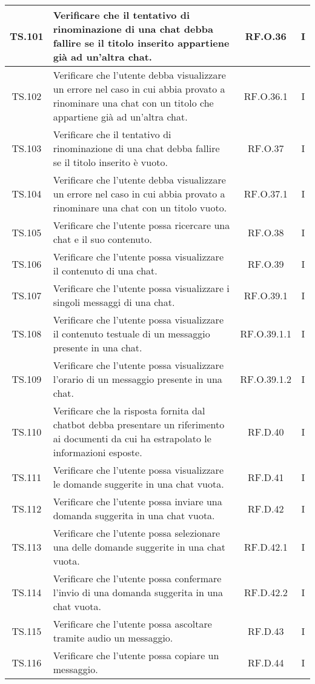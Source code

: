 {{{{{{{{{{\begin{xltabular}{\textwidth}{|c|X|c|c|}
\hline
TS.101 & Verificare che il tentativo di rinominazione di una chat debba fallire se il titolo inserito appartiene già ad un’altra chat. & RF.O.36 & I \\
\hline
TS.102 & Verificare che l'utente debba visualizzare un errore nel caso in cui abbia provato a rinominare una chat con un titolo che appartiene già ad un’altra chat. & RF.O.36.1 & I \\
\hline
TS.103 & Verificare che il tentativo di rinominazione di una chat debba fallire se il titolo inserito è vuoto. & RF.O.37 & I \\
\hline
TS.104 & Verificare che l'utente debba visualizzare un errore nel caso in cui abbia provato a rinominare una chat con un titolo vuoto. & RF.O.37.1 & I \\
\hline
TS.105 & Verificare che l'utente possa ricercare una chat e il suo contenuto. & RF.O.38 & I \\
\hline
TS.106 & Verificare che l'utente possa visualizzare il contenuto di una chat. & RF.O.39 & I \\
\hline
TS.107 & Verificare che l'utente possa visualizzare i singoli messaggi di una chat. & RF.O.39.1 & I \\
\hline
TS.108 & Verificare che l'utente possa visualizzare il contenuto testuale di un messaggio presente in una chat. & RF.O.39.1.1 & I \\
\hline
TS.109 & Verificare che l'utente possa visualizzare l’orario di un messaggio presente in una chat. & RF.O.39.1.2 & I \\
\hline
TS.110 & Verificare che la risposta fornita dal chatbot debba presentare un riferimento ai documenti da cui ha estrapolato le informazioni esposte. & RF.D.40 & I \\
\hline
TS.111 & Verificare che l'utente possa visualizzare le domande suggerite in una chat vuota. & RF.D.41 & I \\
\hline
TS.112 & Verificare che l'utente possa inviare una domanda suggerita in una chat vuota. & RF.D.42 & I \\
\hline
TS.113 & Verificare che l'utente possa selezionare una delle domande suggerite in una chat vuota. & RF.D.42.1 & I \\
\hline
TS.114 & Verificare che l'utente possa confermare l’invio di una domanda suggerita in una chat vuota. & RF.D.42.2 & I \\
\hline
TS.115 & Verificare che l'utente possa ascoltare tramite audio un messaggio. & RF.D.43 & I \\
\hline
TS.116 & Verificare che l'utente possa copiare un messaggio. & RF.D.44 & I \\

\end{xltabular}}}}}}}}}}}
